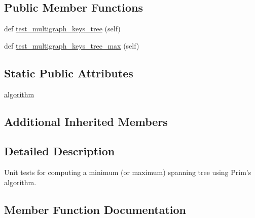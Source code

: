 \subsection*{Public Member Functions}
\begin{DoxyCompactItemize}
\item 
def \hyperlink{classnetworkx_1_1algorithms_1_1tree_1_1tests_1_1test__mst_1_1TestPrim_a2bce471c3fa5c54f0375daa1b1215dc1}{test\+\_\+multigraph\+\_\+keys\+\_\+tree} (self)
\item 
def \hyperlink{classnetworkx_1_1algorithms_1_1tree_1_1tests_1_1test__mst_1_1TestPrim_a83251aa02f2a3690b743dbe5a4dcfc3e}{test\+\_\+multigraph\+\_\+keys\+\_\+tree\+\_\+max} (self)
\end{DoxyCompactItemize}
\subsection*{Static Public Attributes}
\begin{DoxyCompactItemize}
\item 
\hyperlink{classnetworkx_1_1algorithms_1_1tree_1_1tests_1_1test__mst_1_1TestPrim_aa50d76b4cc3a0b8ed1e6ff81b463be60}{algorithm}
\end{DoxyCompactItemize}
\subsection*{Additional Inherited Members}


\subsection{Detailed Description}
\begin{DoxyVerb}Unit tests for computing a minimum (or maximum) spanning tree
using Prim's algorithm.\end{DoxyVerb}
 

\subsection{Member Function Documentation}
\mbox{\label{classnetworkx_1_1algorithms_1_1tree_1_1tests_1_1test__mst_1_1TestPrim_a2bce471c3fa5c54f0375daa1b1215dc1}} 
